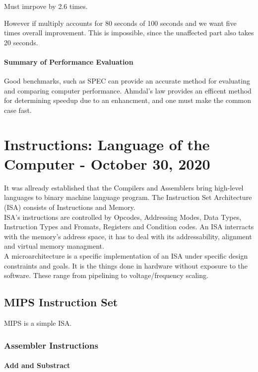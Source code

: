 \documentclass[11pt,a4paper,twocolumn]{book}
\begin{document}
Must imrpove by 2.6 times.

However if multiply accounts for 80 seconds of 100 seconds and we want five times overall improvement. This is impossible, since the unaffected part also takes 20 seconds.

\subsubsection{Summary of Performance Evaluation}

Good benchmarks, such as SPEC can provide an accurate method for evaluating and comparing computer performance. Ahmdal's law provides an efficent method for determining speedup due to an enhancment, and one must make the common case fast.

\chapter{Instructions: Language of the Computer - October 30, 2020}

It was allready established that the Compilers and Assemblers bring high-level languages to binary machine language program. The Instruction Set Architecture (ISA) consists of Instructions and Memory.\\

ISA's instructions are controlled by Opcodes, Addressing Modes, Data Types, Instruction Types and Fromats, Registers and Condition codes. An ISA interracts with the memory's address space, it has to deal with its addressability, alignment and virtual memory managment.\\

A microarchitecture is a specific implementation of an ISA under specific design constraints and goals. It is the things done in hardware without exposure to the software. These range from pipelining to voltage/frequency scaling.

\section{MIPS Instruction Set}

MIPS is a simple ISA.

\subsection{Assembler Instructions}

\subsubsection{Add and Substract}
\end{document}
